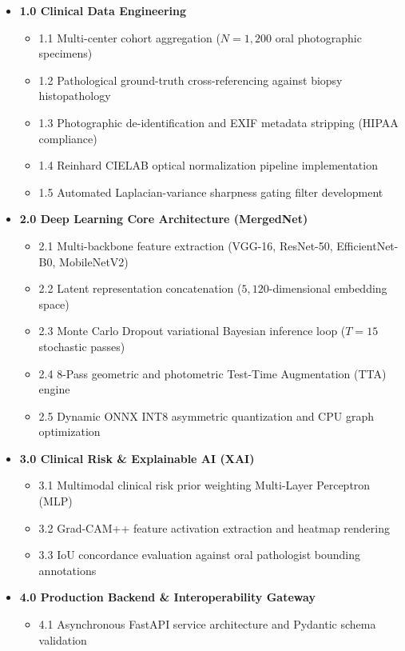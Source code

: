 \documentclass[12pt,a4paper,oneside]{report}
\begin{document}
\begin{itemize}
    \item \textbf{1.0 Clinical Data Engineering}
    \begin{itemize}
        \item 1.1 Multi-center cohort aggregation ($N = 1{,}200$ oral photographic specimens)
        \item 1.2 Pathological ground-truth cross-referencing against biopsy histopathology
        \item 1.3 Photographic de-identification and EXIF metadata stripping (HIPAA compliance)
        \item 1.4 Reinhard CIELAB optical normalization pipeline implementation
        \item 1.5 Automated Laplacian-variance sharpness gating filter development
    \end{itemize}
    \item \textbf{2.0 Deep Learning Core Architecture (MergedNet)}
    \begin{itemize}
        \item 2.1 Multi-backbone feature extraction (VGG-16, ResNet-50, EfficientNet-B0, MobileNetV2)
        \item 2.2 Latent representation concatenation ($5,120$-dimensional embedding space)
        \item 2.3 Monte Carlo Dropout variational Bayesian inference loop ($T = 15$ stochastic passes)
        \item 2.4 8-Pass geometric and photometric Test-Time Augmentation (TTA) engine
        \item 2.5 Dynamic ONNX INT8 asymmetric quantization and CPU graph optimization
    \end{itemize}
    \item \textbf{3.0 Clinical Risk \& Explainable AI (XAI)}
    \begin{itemize}
        \item 3.1 Multimodal clinical risk prior weighting Multi-Layer Perceptron (MLP)
        \item 3.2 Grad-CAM++ feature activation extraction and heatmap rendering
        \item 3.3 IoU concordance evaluation against oral pathologist bounding annotations
    \end{itemize}
    \item \textbf{4.0 Production Backend \& Interoperability Gateway}
    \begin{itemize}
        \item 4.1 Asynchronous FastAPI service architecture and Pydantic schema validation

\end{itemize}
\end{itemize}
\end{document}
